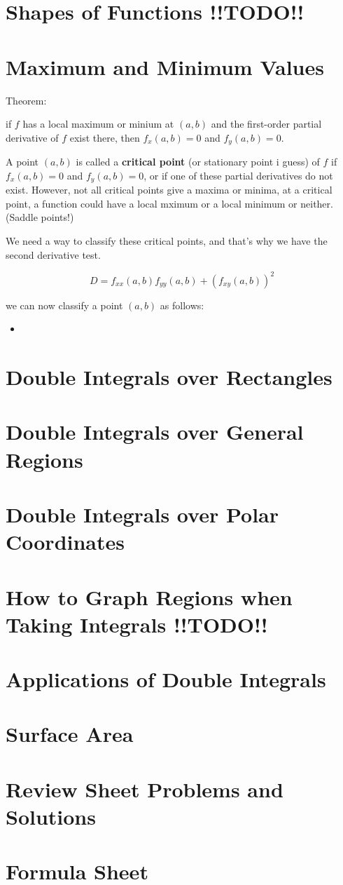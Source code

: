 \documentclass{article}
\begin{document}
\newpage
\section{Shapes of Functions !!TODO!!}

\newpage
\section{Maximum and Minimum Values}

Theorem:
\begin{center}
    if $f$ has a local maximum or minium at $(a,b)$ and the first-order partial derivative of $f$ exist there, then $f_x(a,b) = 0$ and $f_y(a,b) = 0$.
\end{center}

A point $(a,b)$ is called a \textbf{critical point} (or stationary point i guess) of $f$ if $f_x(a,b) = 0$ and $f_y(a,b) = 0$, or if one of these partial derivatives do not exist. However, not all critical points give a maxima or minima, at a critical point, a function could have a local mximum or a local minimum or neither. (Saddle points!) 

We need a way to classify these critical points, and that's why we have the second derivative test.


$$D = f_{xx}(a,b)f_{yy}(a,b) + (f_{xy}(a,b))^2$$

we can now classify a point $(a,b)$ as follows:

\begin{itemize}
    \item 
\end{itemize}

\newpage
\section{Double Integrals over Rectangles}

\newpage
\section{Double Integrals over General Regions}

\newpage
\section{Double Integrals over Polar Coordinates}

\newpage
\section{How to Graph Regions when Taking Integrals !!TODO!!}

\newpage
\section{Applications of Double Integrals}

\newpage
\section{Surface Area}

\newpage
\section{Review Sheet Problems and Solutions}

\newpage
\section{Formula Sheet}
\end{document}
